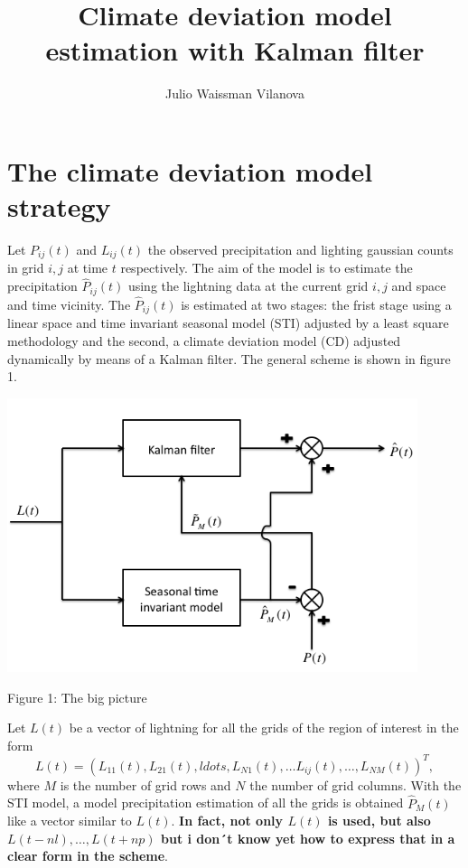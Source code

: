 \documentclass[11pt]{article}
\title{Climate deviation model estimation with Kalman filter}
\author{Julio Waissman Vilanova}\date{}
\begin{document}
\maketitle

\section{The climate deviation model strategy}

Let $P_{ij}(t)$ and $L_{ij}(t)$ the observed precipitation and lighting gaussian counts in
grid $i,j$ at time $t$ respectively. The aim of the model is to estimate the precipitation
$\hat{P}_{ij}(t)$ using the lightning data at the current  grid  $i,j$ and space and time
vicinity. The $\hat{P}_{ij}(t)$ is estimated at two stages: the frist stage using a
linear space and time invariant seasonal model (STI) adjusted by a least square
methodology and the second, a climate
deviation model (CD) adjusted dynamically by means of a Kalman filter. 
The general scheme is shown in figure 1.

\begin{center} 
  \includegraphics[width = 0.9\textwidth]{scheme.png}  

Figure 1: The big picture
\end{center}


Let $L(t)$ be a vector of lightning for all the
grids of the region of interest in the form
$$
L(t) = (L_{11}(t), L_{21}(t), ldots, L_{N1}(t), \ldots L_{ij}(t), \ldots, L_{NM}(t))^T,
$$
where $M$ is the number of grid rows and $N$ the number of grid columns. With the STI
model, a model precipitation estimation of all the grids is obtained $\hat{P}_M(t)$ like a
vector similar to $L(t)$. {\bf In fact, not only $L(t)$ is used, but also $L(t-nl),
  \ldots, L(t+np)$ but i don´t know yet how to express that in a clear form in the scheme}.
\end{document}
